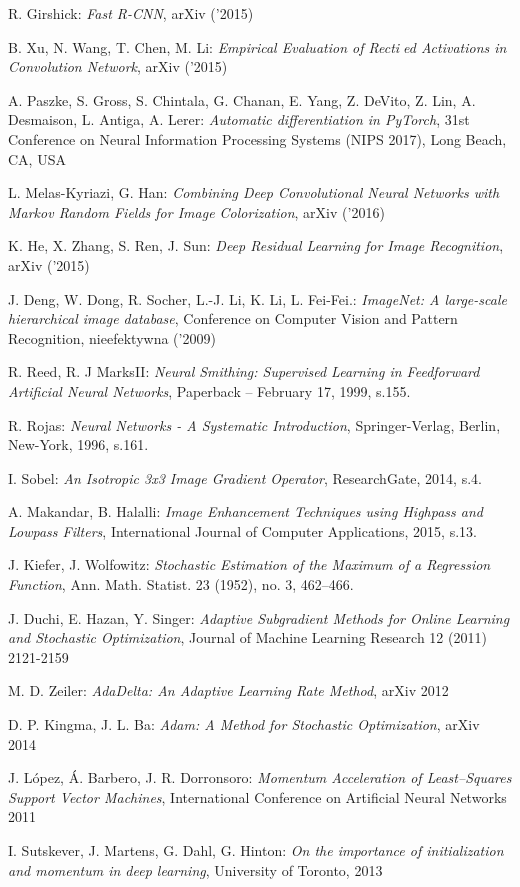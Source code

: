 \begin{thebibliography}{99}
   R. Girshick:
  \emph{Fast R-CNN},
  arXiv ('2015)

   B. Xu, N. Wang, T. Chen, M. Li:
  \emph{Empirical Evaluation of Rectied Activations in Convolution Network},
   arXiv ('2015)

    A. Paszke, S. Gross, S. Chintala, G. Chanan,
   E. Yang, Z. DeVito, Z. Lin, A. Desmaison, L. Antiga, A. Lerer:
   \emph{Automatic differentiation in PyTorch}, 31st Conference on Neural Information
   Processing Systems (NIPS 2017), Long Beach, CA, USA

    L. Melas-Kyriazi, G. Han:
   \emph{Combining Deep Convolutional Neural Networks with Markov Random
   Fields for Image Colorization}, arXiv ('2016)

    K. He, X. Zhang, S. Ren, J. Sun:
   \emph{Deep Residual Learning for Image Recognition}, arXiv ('2015)

   J. Deng, W. Dong, R. Socher, L.-J. Li, K. Li, L. Fei-Fei.:
   \emph{ImageNet: A large-scale hierarchical image database}, Conference on Computer Vision and Pattern Recognition, nieefektywna ('2009)

    R. Reed,  R. J MarksII:
  \emph{Neural Smithing: Supervised Learning in Feedforward Artificial Neural Networks},
  Paperback – February 17, 1999, s.155.

   R. Rojas:
  \emph{Neural Networks - A Systematic Introduction},
  Springer-Verlag, Berlin, New-York, 1996, s.161.

   I. Sobel:
  \emph{An Isotropic 3x3 Image Gradient Operator},
  ResearchGate, 2014, s.4.

   A. Makandar, B. Halalli:
  \emph{Image Enhancement Techniques using Highpass and Lowpass Filters},
  International Journal of Computer Applications, 2015, s.13.

   J. Kiefer, J. Wolfowitz:
  \emph{Stochastic Estimation of the Maximum of a Regression Function},
  Ann. Math. Statist. 23 (1952), no. 3, 462--466.

   J. Duchi, E. Hazan, Y. Singer:
  \emph{Adaptive Subgradient Methods for Online Learning and Stochastic Optimization},
  Journal of Machine Learning Research 12 (2011) 2121-2159

   M. D. Zeiler:
  \emph{AdaDelta: An Adaptive Learning Rate Method},
  arXiv 2012

   D. P. Kingma, J. L. Ba:
  \emph{Adam: A Method for Stochastic Optimization},
  arXiv 2014

   J. López, Á. Barbero, J. R. Dorronsoro:
  \emph{Momentum Acceleration of Least–Squares Support Vector Machines},
  International Conference on Artificial Neural Networks 2011

   I. Sutskever, J. Martens, G. Dahl, G. Hinton:
  \emph{On the importance of initialization and momentum in deep learning},
  University of Toronto, 2013

\end{thebibliography}
